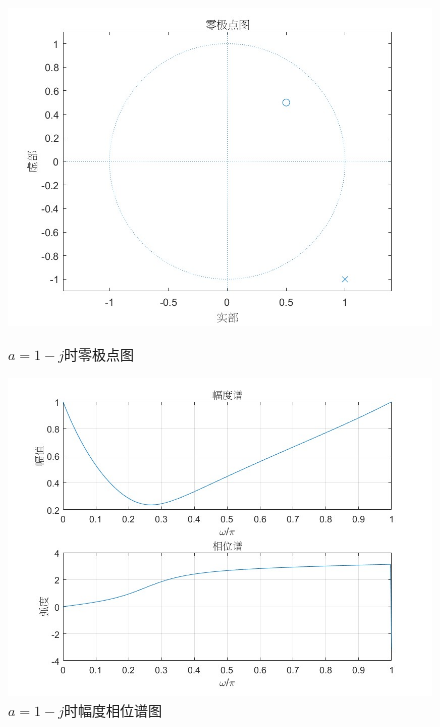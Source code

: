 \documentclass[a4paper,12pt]{article}
\begin{document}
\begin{figure}[h]
    \centering
    \begin{minipage}[b]{0.48\textwidth}
        \centering
        \includegraphics[width=\linewidth]{images/3_Verify/allpass2_1.jpg}
        \caption{$a=1 - j$时零极点图}
    \end{minipage}
    \hfill
    \begin{minipage}[b]{0.48\textwidth}
        \centering
        \includegraphics[width=\linewidth]{images/3_Verify/allpass2_2.jpg}
        \caption{$a=1 - j$时幅度相位谱图}
    \end{minipage}
\end{figure}
\end{document}
